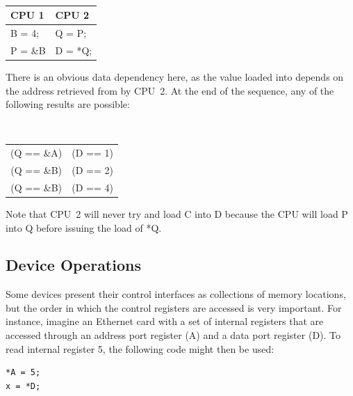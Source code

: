 \vspace{5pt}
\begin{minipage}[t]{\columnwidth}
\tt
\scriptsize
\begin{tabular}{l|l}
	CPU 1 &		CPU 2 \\
	\hline
	B = 4; &	Q = P; \\
	P = \&B &	D = *Q; \\
\end{tabular}
\end{minipage}
\vspace{5pt}

There is an obvious data dependency here,
as the value loaded into  depends on
the address retrieved from  by CPU~2.
At the end of the sequence, any of the
following results are possible:

\vspace{5pt}
\begin{minipage}[t]{\columnwidth}
\tt
\scriptsize
\begin{tabular}{c@{ and }c}
	(Q == \&A) & (D == 1) \\
	(Q == \&B) & (D == 2) \\
	(Q == \&B) & (D == 4) \\
\end{tabular}
\end{minipage}
\vspace{5pt}

Note that CPU~2 will never try and load C into D because the CPU will load P
into Q before issuing the load of *Q.

\subsection{Device Operations}
\label{sec:advsync:Device Operations}

Some devices present their control interfaces as collections of memory
locations, but the order in which the control registers are accessed is very
important.  For instance, imagine an Ethernet card with a set of internal
registers that are accessed through an address port register (A) and a data
port register (D).  To read internal register 5, the following code might then
be used:

\vspace{5pt}
\begin{minipage}[t]{\columnwidth}
\scriptsize
\begin{verbatim}
*A = 5;
x = *D;
\end{verbatim}
\end{minipage}
\vspace{5pt}

